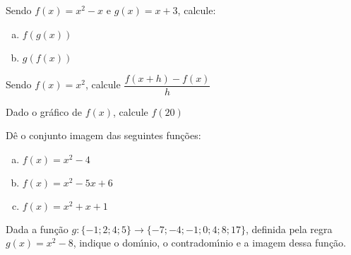 \documentclass[12pt]{article}
\begin{document}
\pagestyle{empty}


\begin{prob}
Sendo $f\left( x\right) = x^{2}-x$ e $g\left( x\right) = x+3$, calcule:
\begin{multicols}{2}
\begin{enumerate}[(a)]
\item    $f\left( g\left( x\right) \right) $
\item    $g\left( f\left( x\right) \right) $
\end{enumerate}
\end{multicols}
\end{prob}

\begin{prob}
Sendo $f\left( x\right) = x^{2}$, calcule $\dfrac{f\left( x+h\right) -f\left( x\right) }{h}$
\end{prob}

\begin{prob}
Dado o gr\'{a}fico de $f\left( x\right)$, calcule $f\left( 20\right)$


\end{prob}

\begin{prob}
D\^{e} o conjunto imagem das seguintes fun\c{c}\~{o}es:
\begin{multicols}{3}
\begin{enumerate}[(a)]
\item    $f\left( x\right) =x^{2}-4$
\item    $f\left( x\right) =x^{2}-5x+6$
\item    $f\left( x\right) =x^{2}+x+1$
\end{enumerate}
\end{multicols}
\end{prob}

\begin{prob}
Dada a fun\c{c}\~{a}o $g:\{ -1;2;4;5\} \rightarrow \{-7;-4;-1;0;4;8;17\}$, definida pela regra $g(x)=x^{2}-8$, indique o dom\'{\i}nio, o contradom\'{\i}nio e a imagem dessa fun\c{c}\~{a}o.
\end{prob}
\end{document}
